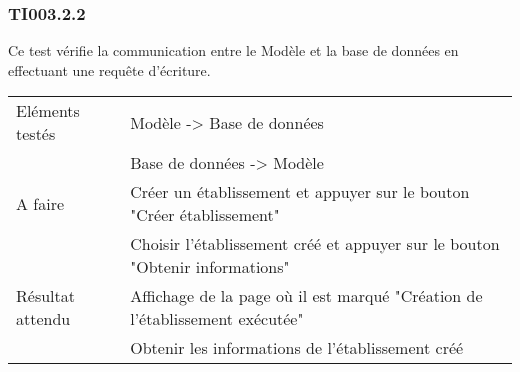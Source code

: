   		
  	\subsubsection{TI003.2.2}
  		Ce test vérifie la communication entre le Modèle et la base de données en effectuant une requête d'écriture.
  		\begin{center}
    	 		\begin{tabular}[h]{|p{}|p{}|}
			\hline
				Eléments testés & Modèle -> Base de données  \\
							    &  Base de données -> Modèle \\\hline
    				A faire & Créer un établissement et appuyer sur le bouton "Créer établissement" \\
    						& Choisir l'établissement créé et appuyer sur le bouton "Obtenir informations" \\\hline
    				Résultat attendu & Affichage de la page où il est marqué "Création de l'établissement exécutée" \\
    								 & Obtenir les informations de l'établissement créé \\\hline
     		\end{tabular}
  		\end{center}	
  		